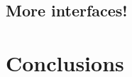 \documentclass[final,3p,twocolumn]{elsarticle}
\begin{document}
%
%
%
%
%
%
%

\subsection{More interfaces!}
\label{subsec:more}

\section{Conclusions}
\label{sec:conclusion}
\end{document}

